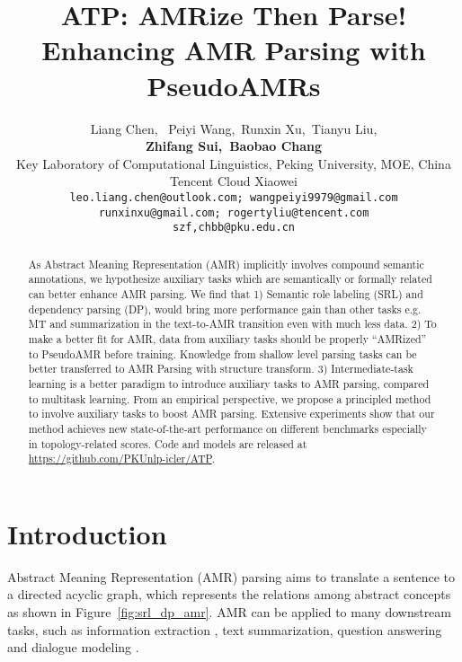 \documentclass[11pt]{article}
\title{ATP: AMRize Then Parse! Enhancing AMR Parsing with PseudoAMRs}
\author{
 Liang Chen, \ Peiyi Wang,\  Runxin Xu,\  Tianyu Liu, \\ \textbf{Zhifang Sui,\  Baobao Chang}
\\ 
 Key Laboratory of Computational Linguistics, Peking University, MOE, China \\
 Tencent Cloud Xiaowei \\
 \texttt{leo.liang.chen@outlook.com; wangpeiyi9979@gmail.com} \\
 \texttt{runxinxu@gmail.com; rogertyliu@tencent.com} \\
 \texttt{szf,chbb@pku.edu.cn}
}
\date{}
\begin{document}
\newcommand{\tianyu}[1]{\textcolor{green}{\bf \small [ #1 --tianyu]}}
\newcommand{\cl}[1]{\textcolor{orange}{\bf \small [ #1 --Chen Liang]}}
\newcommand{\py}[1]{\textcolor{blue}{\bf \small [ #1 --Peiyi]}}

\maketitle
\begin{abstract}



As Abstract Meaning Representation (AMR) implicitly involves compound semantic annotations, we hypothesize auxiliary tasks which are semantically or formally related can better enhance AMR parsing. We find that 1) Semantic role labeling (SRL) and dependency parsing (DP), would bring more performance gain than other tasks e.g. MT and summarization in the text-to-AMR transition even with much less data. 2) To make a better fit for AMR, data from auxiliary tasks should be properly ``AMRized'' to PseudoAMR before training. Knowledge from shallow level parsing tasks can be better transferred to AMR Parsing with structure transform. 3) Intermediate-task learning is a better paradigm to introduce auxiliary tasks to AMR parsing, compared to multitask learning. From an empirical perspective, we propose a principled method to involve auxiliary tasks to boost AMR parsing. Extensive experiments show that our method achieves new state-of-the-art performance on different benchmarks especially in topology-related scores. Code and models are released at \url{https://github.com/PKUnlp-icler/ATP}.


%
 \end{abstract}
\renewcommand{\thefootnote}{\fnsymbol{footnote}}
\section{Introduction}
Abstract Meaning Representation (AMR) \citep{ban-AMR} parsing aims to translate a sentence to a directed acyclic graph, which represents the relations among abstract concepts as shown in Figure~\ref{fig:srl_dp_amr}. AMR can be applied to many downstream tasks, such as information extraction \cite{rao-amr-ie, wang-amr-ie, zhang-amr-ie}, text summarization,  \cite{liao-amr-tm, hardy-amr-tm} question answering \cite{mitra-amr-qa, sacha-amr-qa} and dialogue modeling \citep{Bonial2020DialogueAMRAM}.
\end{document}
